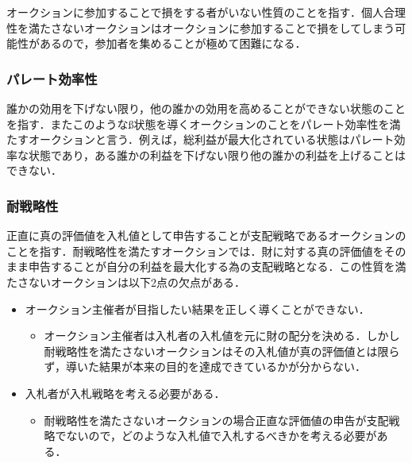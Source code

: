 オークションに参加することで損をする者がいない性質のことを指す．個人合理性を満たさないオークションはオークションに参加することで損をしてしまう可能性があるので，参加者を集めることが極めて困難になる．

\hypertarget{ux30d1ux30ecux30fcux30c8ux52b9ux7387ux6027}{%
\subsubsection{パレート効率性}\label{ux30d1ux30ecux30fcux30c8ux52b9ux7387ux6027}}

誰かの効用を下げない限り，他の誰かの効用を高めることができない状態のことを指す．またこのようなß状態を導くオークションのことをパレート効率性を満たすオークションと言う．例えば，総利益が最大化されている状態はパレート効率な状態であり，ある誰かの利益を下げない限り他の誰かの利益を上げることはできない．

\hypertarget{ux8010ux6226ux7565ux6027}{%
\subsubsection{耐戦略性}\label{ux8010ux6226ux7565ux6027}}

正直に真の評価値を入札値として申告することが支配戦略であるオークションのことを指す．耐戦略性を満たすオークションでは．財に対する真の評価値をそのまま申告することが自分の利益を最大化する為の支配戦略となる．この性質を満たさないオークションは以下2点の欠点がある．

\begin{itemize}
\tightlist
\item
  オークション主催者が目指したい結果を正しく導くことができない．

  \begin{itemize}
  \tightlist
  \item
    オークション主催者は入札者の入札値を元に財の配分を決める．しかし耐戦略性を満たさないオークションはその入札値が真の評価値とは限らず，導いた結果が本来の目的を達成できているかが分からない．
  \end{itemize}
\item
  入札者が入札戦略を考える必要がある．

  \begin{itemize}
  \tightlist
  \item
    耐戦略性を満たさないオークションの場合正直な評価値の申告が支配戦略でないので，どのような入札値で入札するべきかを考える必要がある．
  \end{itemize}
\end{itemize}


